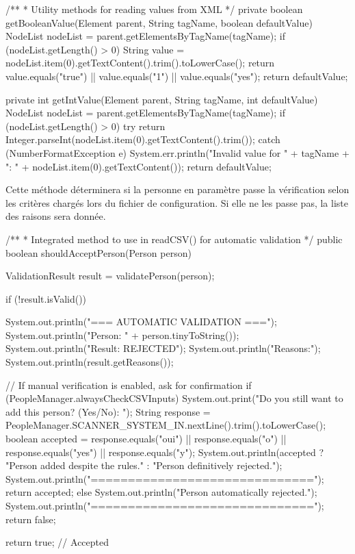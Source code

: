 \documentclass{mytex}
\begin{document}
\begin{codebox}
/**
* Utility methods for reading values from XML
*/
private boolean getBooleanValue(Element parent, String tagName, boolean defaultValue) {
	NodeList nodeList = parent.getElementsByTagName(tagName);
	if (nodeList.getLength() > 0) {
		String value = nodeList.item(0).getTextContent().trim().toLowerCase();
		return value.equals("true") || value.equals("1") || value.equals("yes");
	}
	return defaultValue;
}

private int getIntValue(Element parent, String tagName, int defaultValue) {
	NodeList nodeList = parent.getElementsByTagName(tagName);
	if (nodeList.getLength() > 0) {
		try {
			return Integer.parseInt(nodeList.item(0).getTextContent().trim());
		} catch (NumberFormatException e) {
			System.err.println("Invalid value for " + tagName + ": " + nodeList.item(0).getTextContent());
		}
	}
	return defaultValue;
}
\end{codebox}


Cette méthode déterminera si la personne en paramètre passe la vérification selon les critères chargés lors du fichier de configuration. Si elle ne les passe pas, la liste des raisons sera donnée.

\begin{codebox}
/**
* Integrated method to use in readCSV() for automatic validation
*/
public boolean shouldAcceptPerson(Person person) {
	ValidationResult result = validatePerson(person);
	
	if (!result.isValid()) {
		System.out.println("=== AUTOMATIC VALIDATION ===");
		System.out.println("Person: " + person.tinyToString());
		System.out.println("Result: REJECTED");
		System.out.println("Reasons:");
		System.out.println(result.getReasons());
		
		// If manual verification is enabled, ask for confirmation
		if (PeopleManager.alwaysCheckCSVInputs) {
			System.out.print("Do you still want to add this person? (Yes/No): ");
			String response = PeopleManager.SCANNER_SYSTEM_IN.nextLine().trim().toLowerCase();
			boolean accepted = response.equals("oui") || response.equals("o") || response.equals("yes") || response.equals("y");
			System.out.println(accepted ? "Person added despite the rules." : "Person definitively rejected.");
			System.out.println("==============================\n");
			return accepted;
		} else {
			System.out.println("Person automatically rejected.");
			System.out.println("==============================\n");
			return false;
		}
	}
	
	return true; // Accepted
}
\end{codebox}
\end{document}
